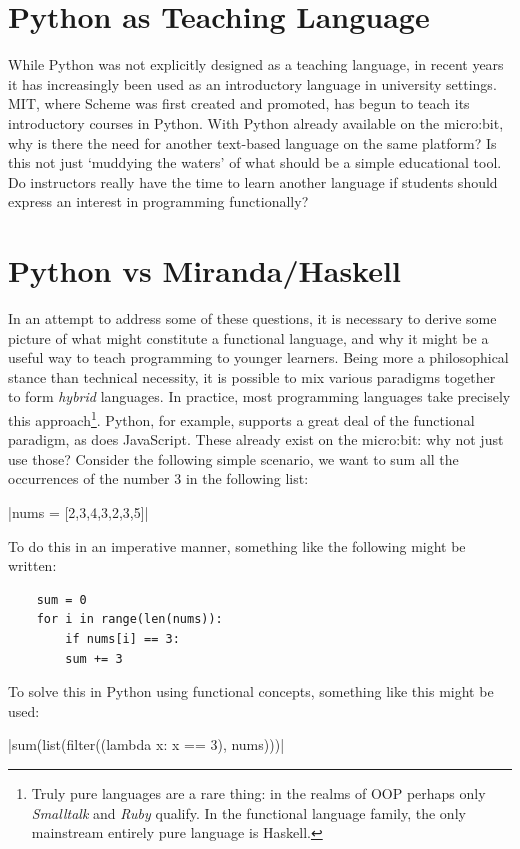 \documentclass[12pt, a4paper]{report}
\begin{document}
\section{Python as Teaching Language}
While Python was not explicitly designed as a teaching language, in recent years it has increasingly
been used as an introductory language in university settings. MIT, where Scheme was first created
and promoted, has begun to teach its introductory courses in Python. With Python already available
on the micro:bit, why is there the need for another text-based language on the same platform? Is
this not just `muddying the waters' of what should be a simple educational tool. Do instructors
really have the time to learn another language if students should express an interest in programming
functionally?


\section{Python vs Miranda/Haskell}
In an attempt to address some of these questions, it is necessary to derive some picture of what might
constitute a functional language, and why it might be a useful way to teach programming to younger
learners. Being more a philosophical stance than technical necessity, it is possible to mix various
paradigms together to form \textit{hybrid} languages. In practice, most programming languages take
precisely this approach\footnote{Truly pure languages are a rare thing: in the realms of OOP perhaps
only \textit{Smalltalk} and \textit{Ruby} qualify. In the functional language family, the only
mainstream entirely pure language is Haskell.}. Python, for example, supports a great deal of the 
functional paradigm, as does JavaScript. These already exist on the micro:bit: why not just use those? 
Consider the following simple scenario, we want to sum all the occurrences of the number 3 in the
following list: 

|nums = [2,3,4,3,2,3,5]|

To do this in an imperative manner, something like the following might be written:

\begin{verbatim}
    sum = 0
    for i in range(len(nums)):
        if nums[i] == 3:
        sum += 3
\end{verbatim}

To solve this in Python using functional concepts, something like this might be used:

|sum(list(filter((lambda x: x == 3), nums)))|
\end{document}
